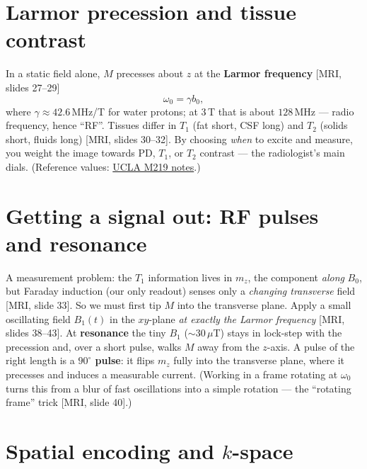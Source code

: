 \documentclass[11pt]{article}
\newcommand{\deck}[1]{\textsf{\small[#1]}}
\begin{document}
\section{Larmor precession and tissue contrast}

In a static field alone, $M$ precesses about $z$ at the \textbf{Larmor frequency}
\deck{MRI, slides 27--29}
\[
\omega_0 = \gamma b_0,
\]
where $\gamma\approx 42.6$\,MHz/T for water protons; at $3$\,T that is about
$128$\,MHz --- radio frequency, hence ``RF''. Tissues differ in $T_1$ (fat short,
CSF long) and $T_2$ (solids short, fluids long) \deck{MRI, slides 30--32}. By
choosing \emph{when} to excite and measure, you weight the image towards PD,
$T_1$, or $T_2$ contrast --- the radiologist's main dials. (Reference values:
\href{https://labs.dgsom.ucla.edu/file/418603/M219_Lecture06_Bloch_Relaxation_II.pdf}{UCLA
M219 notes}.)

\section{Getting a signal out: RF pulses and resonance}

A measurement problem: the $T_1$ information lives in $m_z$, the component
\emph{along} $B_0$, but Faraday induction (our only readout) senses only a
\emph{changing transverse} field \deck{MRI, slide 33}. So we must first tip $M$
into the transverse plane. Apply a small oscillating field $B_1(t)$ in the
$xy$-plane \emph{at exactly the Larmor frequency} \deck{MRI, slides 38--43}. At
\textbf{resonance} the tiny $B_1$ ($\sim 30\,\mu$T) stays in lock-step with the
precession and, over a short pulse, walks $M$ away from the $z$-axis. A pulse of
the right length is a \textbf{$90^\circ$ pulse}: it flips $m_z$ fully into the
transverse plane, where it precesses and induces a measurable current. (Working
in a frame rotating at $\omega_0$ turns this from a blur of fast oscillations
into a simple rotation --- the ``rotating frame'' trick \deck{MRI, slide 40}.)

\section{Spatial encoding and $k$-space}
\end{document}
